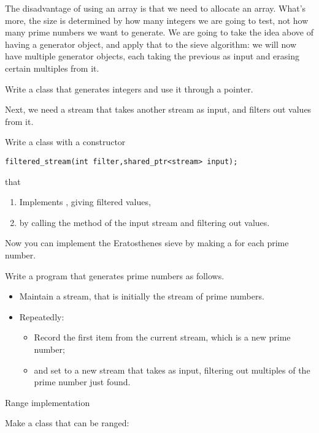 The disadvantage of using an array is that we need to allocate
an array. What's more, the size is determined by how many integers we
are going to test, not how many prime numbers we want to generate.
We are going to take the idea above of having a generator object, and
apply that to the sieve algorithm: we will now have multiple generator
objects, each taking the previous as input and erasing certain
multiples from it.

\begin{exercise}
  Write a  class that generates integers and use it through
  a pointer.
\end{exercise}

Next, we need a stream that takes another stream as input, and filters
out values from it.

\begin{exercise}
  Write a class  with a constructor
\begin{lstlisting}
filtered_stream(int filter,shared_ptr<stream> input);
\end{lstlisting}
  that
  \begin{enumerate}
  \item Implements , giving filtered values,
  \item by calling the  method of the input stream and
    filtering out values.
  \end{enumerate}
\end{exercise}

Now you can implement the Eratosthenes sieve by making a
 for each prime number.

\begin{exercise}
  Write a program that generates prime numbers as follows.
  \begin{itemize}
  \item Maintain a  stream, that is initially the stream of
    prime numbers.
  \item Repeatedly:
    \begin{itemize}
    \item Record the first item from the current stream, which is a
      new prime number;
    \item and set  to a new stream that takes 
      as input, filtering out multiples of the prime number just found.
    \end{itemize}
  \end{itemize}
\end{exercise}

 {Range implementation}

\prerequisite{\ref{sec:range-iter}}

\begin{exercise}
  \label{ex:primerange}
  Make a  class that can be ranged:
\end{exercise}
